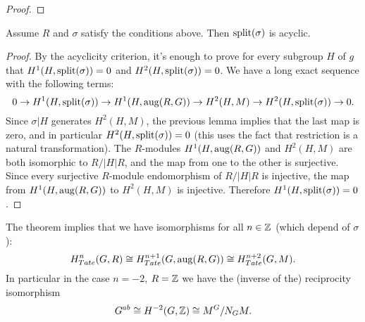 \begin{proof}

\end{proof}

\begin{theorem}
	Assume $R$ and $\sigma$ satisfy the conditions above. Then	$\mathrm{split}(\sigma)$ is acyclic.
\end{theorem}

\begin{proof}
	By the acyclicity criterion, it's enough to prove for every subgroup $H$ of $g$ that
	$H^1(H,\mathrm{split}(\sigma))=0$ and $H^2(H,\mathrm{split}(\sigma))=0$.
	We have a long exact sequence with the following terms:
	\[
		0 \to H^1(H,\mathrm{split}(\sigma)) \to H^1(H,\mathrm{aug}(R,G)) \to H^2(H,M) \to H^2(H,\mathrm{split}(\sigma))
		\to 0.
	\]
	Since $\sigma|H$ generates $H^2(H,M)$, the previous lemma implies that the last map is zero, and in particular $H^2(H,\mathrm{split}(\sigma))=0$ (this uses the fact that restriction is a natural
	transformation).
	The $R$-modules $H^1(H,\mathrm{aug}(R,G))$ and $H^2(H,M)$ are both isomorphic to $R / |H|R$, and the map from one to the other is surjective.
	Since every surjective $R$-module endomorphism of $R /|H|R$ is injective, the map
	from $H^1(H,\mathrm{aug}(R,G))$ to $H^2(H,M)$ is injective.
	Therefore $H^1(H,\mathrm{split}(\sigma))=0$.
\end{proof}



The theorem implies that we have isomorphisms for all $n\in {\mathbb Z}$ (which depend of $\sigma$):
\[
	H^{n}_{Tate}(G,R) \cong H^{n+1}_{Tate}(G,\mathrm{aug}(R,G)) \cong H^{n+2}_{Tate}(G,M).
\]
In particular in the case $n = -2$, $R = {\mathbb Z}$ we have the (inverse of the) reciprocity isomorphism
\[
	G^{ab} \cong H^{-2}(G,{\mathbb Z}) \cong M^G / N_G M.
\]
